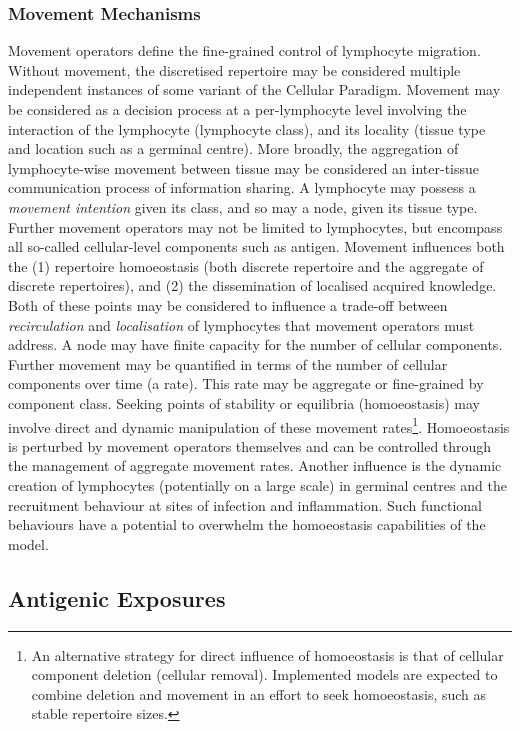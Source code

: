 \subsubsection{Movement Mechanisms}
\label{subsec:tissues:paradigm:models:movement}
Movement operators define the fine-grained control of lymphocyte migration. Without movement, the discretised repertoire may be considered multiple independent instances of some variant of the Cellular Paradigm. Movement may be considered as a decision process at a per-lymphocyte level involving the interaction of the lymphocyte (lymphocyte class), and its locality (tissue type and location such as a germinal centre). More broadly, the aggregation of lymphocyte-wise movement between tissue may be considered an inter-tissue communication process of information sharing. A lymphocyte may possess a \emph{movement intention} given its class, and so may a node, given its tissue type. Further movement operators may not be limited to lymphocytes, but encompass all so-called cellular-level components such as antigen. 
Movement influences both the (1) repertoire homoeostasis (both discrete repertoire and the aggregate of discrete repertoires), and (2) the dissemination of localised acquired knowledge. Both of these points may be considered to influence a trade-off between \emph{recirculation} and \emph{localisation} of lymphocytes that movement operators must address. A node may have finite capacity for the number of cellular components. Further movement may be quantified in terms of the number of cellular components over time (a rate). This rate may be aggregate or fine-grained by component class. Seeking points of stability or equilibria (homoeostasis) may involve direct and dynamic manipulation of these movement rates\footnote{An alternative strategy for direct influence of homoeostasis is that of cellular component deletion (cellular removal). Implemented models are expected to combine deletion and movement in an effort to seek homoeostasis, such as stable repertoire sizes.}. Homoeostasis is perturbed by movement operators themselves and can be controlled through the management of aggregate movement rates. Another influence is the dynamic creation of lymphocytes (potentially on a large scale) in germinal centres and the recruitment behaviour at sites of infection and inflammation. Such functional behaviours have a potential to overwhelm the homoeostasis capabilities of the model. 

%
%
\subsection{Antigenic Exposures}
\label{subsec:tissues:paradigm:exposures}
%
%
